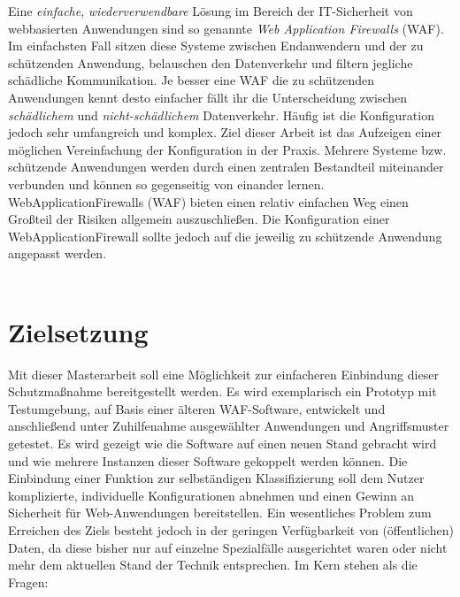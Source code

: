 Eine \emph{einfache}, \emph{wiederverwendbare} Lösung im Bereich der IT-Sicherheit von webbasierten Anwendungen sind so genannte \emph{Web Application Firewalls} (WAF). Im einfachsten Fall sitzen diese Systeme zwischen Endanwendern und der zu schützenden Anwendung, belauschen den Datenverkehr und filtern jegliche schädliche Kommunikation. Je besser eine WAF die zu schützenden Anwendungen kennt desto einfacher fällt ihr die Unterscheidung zwischen \emph{schädlichem} und \emph{nicht-schädlichem} Datenverkehr. Häufig ist die Konfiguration jedoch sehr umfangreich und komplex. Ziel dieser Arbeit ist das Aufzeigen einer möglichen Vereinfachung der Konfiguration in der Praxis. Mehrere Systeme bzw. schützende Anwendungen werden durch einen zentralen Bestandteil miteinander verbunden und können so gegenseitig von einander lernen. WebApplicationFirewalls (WAF) bieten einen relativ einfachen Weg einen Großteil der Risiken allgemein auszuschließen. Die Konfiguration einer WebApplicationFirewall sollte jedoch auf die jeweilig zu schützende Anwendung angepasst werden. \\\\



\section{Zielsetzung}

Mit dieser Masterarbeit soll eine Möglichkeit zur einfacheren Einbindung dieser Schutzmaßnahme bereitgestellt werden. Es wird exemplarisch ein Prototyp mit Testumgebung, auf Basis einer älteren WAF-Software, entwickelt und anschließend unter Zuhilfenahme ausgewählter  Anwendungen und Angriffsmuster getestet.  Es wird gezeigt wie die Software auf einen neuen Stand gebracht wird und wie mehrere Instanzen dieser Software gekoppelt werden können. Die Einbindung einer Funktion zur selbständigen Klassifizierung soll dem Nutzer komplizierte, individuelle Konfigurationen abnehmen und einen Gewinn an Sicherheit für Web-Anwendungen bereitstellen. Ein wesentliches Problem zum Erreichen des Ziels besteht jedoch in der geringen Verfügbarkeit von (öffentlichen) Daten, da diese bisher nur auf einzelne Spezialfälle ausgerichtet waren oder nicht mehr dem aktuellen Stand der Technik entsprechen. Im Kern stehen als die Fragen:

